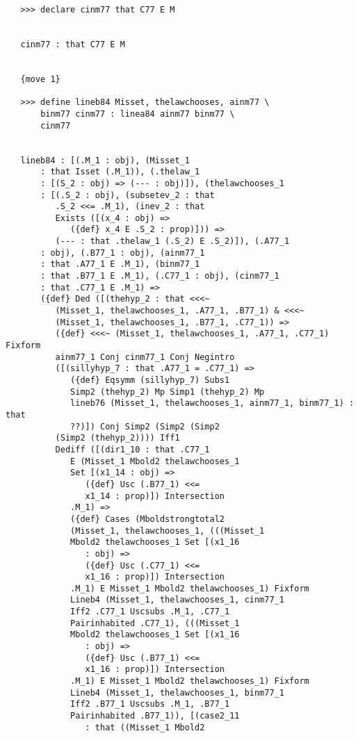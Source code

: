 \documentclass[12pt]{article}
\begin{document}
\begin{verbatim}
   >>> declare cinm77 that C77 E M


   cinm77 : that C77 E M


   {move 1}

   >>> define lineb84 Misset, thelawchooses, ainm77 \
       binm77 cinm77 : linea84 ainm77 binm77 \
       cinm77


   lineb84 : [(.M_1 : obj), (Misset_1 
       : that Isset (.M_1)), (.thelaw_1 
       : [(S_2 : obj) => (--- : obj)]), (thelawchooses_1 
       : [(.S_2 : obj), (subsetev_2 : that 
          .S_2 <<= .M_1), (inev_2 : that 
          Exists ([(x_4 : obj) => 
             ({def} x_4 E .S_2 : prop)])) => 
          (--- : that .thelaw_1 (.S_2) E .S_2)]), (.A77_1 
       : obj), (.B77_1 : obj), (ainm77_1 
       : that .A77_1 E .M_1), (binm77_1 
       : that .B77_1 E .M_1), (.C77_1 : obj), (cinm77_1 
       : that .C77_1 E .M_1) => 
       ({def} Ded ([(thehyp_2 : that <<<~ 
          (Misset_1, thelawchooses_1, .A77_1, .B77_1) & <<<~ 
          (Misset_1, thelawchooses_1, .B77_1, .C77_1)) => 
          ({def} <<<~ (Misset_1, thelawchooses_1, .A77_1, .C77_1) Fixform 
          ainm77_1 Conj cinm77_1 Conj Negintro 
          ([(sillyhyp_7 : that .A77_1 = .C77_1) => 
             ({def} Eqsymm (sillyhyp_7) Subs1 
             Simp2 (thehyp_2) Mp Simp1 (thehyp_2) Mp 
             lineb76 (Misset_1, thelawchooses_1, ainm77_1, binm77_1) : that 
             ??)]) Conj Simp2 (Simp2 (Simp2 
          (Simp2 (thehyp_2)))) Iff1 
          Dediff ([(dir1_10 : that .C77_1 
             E (Misset_1 Mbold2 thelawchooses_1 
             Set [(x1_14 : obj) => 
                ({def} Usc (.B77_1) <<= 
                x1_14 : prop)]) Intersection 
             .M_1) => 
             ({def} Cases (Mboldstrongtotal2 
             (Misset_1, thelawchooses_1, (((Misset_1 
             Mbold2 thelawchooses_1 Set [(x1_16 
                : obj) => 
                ({def} Usc (.C77_1) <<= 
                x1_16 : prop)]) Intersection 
             .M_1) E Misset_1 Mbold2 thelawchooses_1) Fixform 
             Lineb4 (Misset_1, thelawchooses_1, cinm77_1 
             Iff2 .C77_1 Uscsubs .M_1, .C77_1 
             Pairinhabited .C77_1), (((Misset_1 
             Mbold2 thelawchooses_1 Set [(x1_16 
                : obj) => 
                ({def} Usc (.B77_1) <<= 
                x1_16 : prop)]) Intersection 
             .M_1) E Misset_1 Mbold2 thelawchooses_1) Fixform 
             Lineb4 (Misset_1, thelawchooses_1, binm77_1 
             Iff2 .B77_1 Uscsubs .M_1, .B77_1 
             Pairinhabited .B77_1)), [(case2_11 
                : that ((Misset_1 Mbold2 

\end{verbatim}
\end{document}
